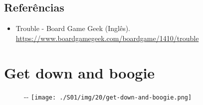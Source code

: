\hypertarget{referuxeancias-3}{%
\subsection{Referências}\label{referuxeancias-3}}

\begin{itemize}
\tightlist
\item
  \sloppy Trouble - Board Game Geek (Inglês). \url{https://www.boardgamegeek.com/boardgame/1410/trouble}
\end{itemize}

\hypertarget{get-down-and-boogie}{%
\section{Get down and boogie}\label{get-down-and-boogie}}

\begin{figure}[!ht]
  \begin{adjustwidth}{-\oddsidemargin-1in}{-\rightmargin}
    \centering
    \texttt{[image: ./S01/img/20/get-down-and-boogie.png]}
  \end{adjustwidth}
\end{figure}

